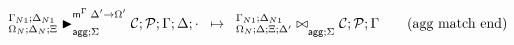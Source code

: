 \[
\trans{
   \matstatea{\Delta_N}{\lstack{C};
      \lstack{P}}{\Gamma}{\Delta}{\cdot}{\Delta' \rightarrow
         \Omega'}{\Sigma}
}
{
   \fixstatea{\Delta}{\Xi; \Delta'}{\lstack{C}; \lstack{P}}{\Gamma}{\Sigma}
} \tag{agg match end}
\]
